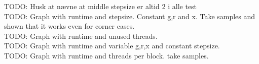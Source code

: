 TODO: Husk at nævne at middle stepsize er altid 2 i alle test\\

TODO: Graph with runtime and stepsize. Constant g,r and x. Take samples and shown that it works even for corner cases.\\
TODO: Graph with runtime and unused threads.\\
TODO: Graph with runtime and variable g,r,x and constant stepsize.\\
TODO: Graph with runtime and threads per block. take samples.
